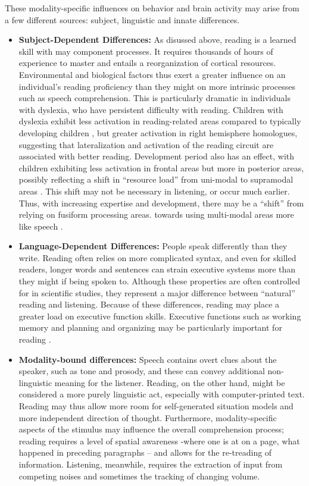 These modality-specific influences on behavior and brain activity may arise from a few different sources: subject, linguistic and innate differences. 

\begin{itemize}
	\item \textbf{Subject-Dependent Differences:} As disussed above, reading is a learned skill with may component processes. It requires thousands of hours of experience to master and entails a reorganization of cortical resources. Environmental and biological factors thus exert a greater influence on an individual’s reading proficiency than they might on more intrinsic processes such as speech comprehension. This is particularly dramatic in individuals with dyslexia, who have persistent difficulty with reading. Children with dyslexia exhibit less activation in reading-related areas compared to typically developing children \cite{Pugh2000}, but greater activation in right hemisphere homologues, suggesting that lateralization and activation of the reading circuit are associated with better reading. Development period also has an effect, with children exhibiting less activation in frontal areas but more in posterior areas, possibly reflecting a shift in “resource load” from uni-modal to supramodal areas \cite{Berl2010}. This shift may not be necessary in listening, or occur much earlier. Thus, with increasing expertise and development, there may be a “shift” from relying on fusiform processing areas. towards using multi-modal areas more like speech \cite{Monzalvo}. 

	\item \textbf{Language-Dependent Differences:} People speak differently than they write. Reading often relies on more complicated syntax, and even for skilled readers, longer words and sentences can strain executive systems more than they might if being spoken to. Although these properties are often controlled for in scientific studies, they represent a major difference between “natural” reading and listening. Because of these differences, reading may place a greater load on executive function skills. Executive functions such as working memory and planning and organizing may be particularly important for reading \cite{Cain}.  
	
	\item \textbf{Modality-bound differences:} Speech contains overt clues about the speaker, such as tone and prosody, and these can convey additional non-linguistic meaning for the listener. Reading, on the other hand, might be considered a more purely linguistic act, especially with computer-printed text. Reading may thus allow more room for self-generated situation models and more independent direction of thought. Furthermore, modality-specific aspects of the stimulus may influence the overall comprehension process; reading requires a level of spatial awareness -where one is at on a page, what happened in preceding paragraphs – and allows for the re-treading of information. Listening, meanwhile, requires the extraction of input from competing noises and sometimes the tracking of changing volume. 
\end{itemize}
